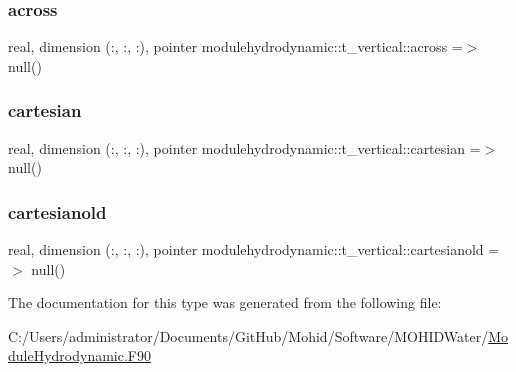 \subsubsection{\texorpdfstring{across}{across}}
{\footnotesize\ttfamily real, dimension (\+:, \+:, \+:), pointer modulehydrodynamic\+::t\+\_\+vertical\+::across =$>$ null()\hspace{0.3cm}{\ttfamily [private]}}

\mbox{\label{structmodulehydrodynamic_1_1t__vertical_a7e803e84ec7f372b1b3cd2df1731e431}} 
\subsubsection{\texorpdfstring{cartesian}{cartesian}}
{\footnotesize\ttfamily real, dimension (\+:, \+:, \+:), pointer modulehydrodynamic\+::t\+\_\+vertical\+::cartesian =$>$ null()\hspace{0.3cm}{\ttfamily [private]}}

\mbox{\label{structmodulehydrodynamic_1_1t__vertical_a38efb04d6b8310678f4a4bf7ccd0d942}} 
\subsubsection{\texorpdfstring{cartesianold}{cartesianold}}
{\footnotesize\ttfamily real, dimension (\+:, \+:, \+:), pointer modulehydrodynamic\+::t\+\_\+vertical\+::cartesianold =$>$ null()\hspace{0.3cm}{\ttfamily [private]}}



The documentation for this type was generated from the following file\+:\begin{DoxyCompactItemize}
\item 
C\+:/\+Users/administrator/\+Documents/\+Git\+Hub/\+Mohid/\+Software/\+M\+O\+H\+I\+D\+Water/\mbox{\hyperlink{_module_hydrodynamic_8_f90}{Module\+Hydrodynamic.\+F90}}\end{DoxyCompactItemize}

